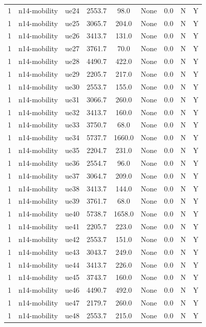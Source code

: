 \begin{table}[ht]
\begin{tabular}{|c|c|c|c|c|c|c|c|c|}
1 & n14-mobility & ue24 & 2553.7 & 98.0 & None & 0.0 & N & Y \\
1 & n14-mobility & ue25 & 3065.7 & 204.0 & None & 0.0 & N & Y \\
1 & n14-mobility & ue26 & 3413.7 & 131.0 & None & 0.0 & N & Y \\
1 & n14-mobility & ue27 & 3761.7 & 70.0 & None & 0.0 & N & Y \\
1 & n14-mobility & ue28 & 4490.7 & 422.0 & None & 0.0 & N & Y \\
1 & n14-mobility & ue29 & 2205.7 & 217.0 & None & 0.0 & N & Y \\
1 & n14-mobility & ue30 & 2553.7 & 155.0 & None & 0.0 & N & Y \\
1 & n14-mobility & ue31 & 3066.7 & 260.0 & None & 0.0 & N & Y \\
1 & n14-mobility & ue32 & 3413.7 & 160.0 & None & 0.0 & N & Y \\
1 & n14-mobility & ue33 & 3750.7 & 68.0 & None & 0.0 & N & Y \\
1 & n14-mobility & ue34 & 5737.7 & 1660.0 & None & 0.0 & N & Y \\
1 & n14-mobility & ue35 & 2204.7 & 231.0 & None & 0.0 & N & Y \\
1 & n14-mobility & ue36 & 2554.7 & 96.0 & None & 0.0 & N & Y \\
1 & n14-mobility & ue37 & 3064.7 & 209.0 & None & 0.0 & N & Y \\
1 & n14-mobility & ue38 & 3413.7 & 144.0 & None & 0.0 & N & Y \\
1 & n14-mobility & ue39 & 3761.7 & 68.0 & None & 0.0 & N & Y \\
1 & n14-mobility & ue40 & 5738.7 & 1658.0 & None & 0.0 & N & Y \\
1 & n14-mobility & ue41 & 2205.7 & 223.0 & None & 0.0 & N & Y \\
1 & n14-mobility & ue42 & 2553.7 & 151.0 & None & 0.0 & N & Y \\
1 & n14-mobility & ue43 & 3043.7 & 249.0 & None & 0.0 & N & Y \\
1 & n14-mobility & ue44 & 3413.7 & 226.0 & None & 0.0 & N & Y \\
1 & n14-mobility & ue45 & 3743.7 & 160.0 & None & 0.0 & N & Y \\
1 & n14-mobility & ue46 & 4490.7 & 492.0 & None & 0.0 & N & Y \\
1 & n14-mobility & ue47 & 2179.7 & 260.0 & None & 0.0 & N & Y \\
1 & n14-mobility & ue48 & 2553.7 & 215.0 & None & 0.0 & N & Y \\

\end{tabular}
\end{table}
